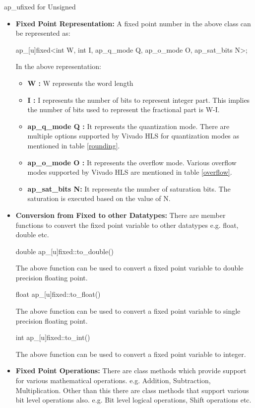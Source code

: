 \hspace{3cm}ap\_ufixed for Unsigned
\begin{itemize}
\item
\textbf{Fixed Point Representation:}
A fixed point number in the above class can be represented as:

ap\_[u]fixed\textless int W, int I, ap\_q\_mode Q, ap\_o\_mode O, ap\_sat\_bits N\textgreater;

In the above representation:
\begin{itemize}
\item
\textbf{W :} W represents the word length
\item
\textbf{I :} I represents the number of bits to represent integer part. This implies the number of bits used to represent the fractional part is W-I.
\item
\textbf{ap\_q\_mode Q :} It represents the quantization mode. There are multiple options supported by Vivado HLS for quantization modes as mentioned in table \ref{rounding}.

\item
\textbf{ ap\_o\_mode O :} It represents the overflow mode. Various overflow modes supported by Vivado HLS are mentioned in table \ref{overflow}.


\item
\textbf{ap\_sat\_bits N:} It represents the number of saturation bits. The saturation is executed based on the value of N.
\end{itemize}

\item
\textbf{Conversion from Fixed to other Datatypes:}
There are member functions to convert the fixed point variable to other datatypes e.g. float, double etc. 

\hspace{3cm} double ap\_[u]fixed::to\_double()

The above function can be used to convert a fixed point variable to double precision floating point.

\hspace{3cm} float ap\_[u]fixed::to\_float()

The above function can be used to convert a fixed point variable to single precision floating point.

\hspace{3cm} int ap\_[u]fixed::to\_int()

The above function can be used to convert a fixed point variable to integer.

\item
\textbf{Fixed Point Operations:} There are class methods which provide support for various mathematical operations. e.g. Addition, Subtraction, Multiplication. Other than this there are class methods that support various bit level operations also. e.g. Bit level logical operations, Shift operations etc.  
\end{itemize}
